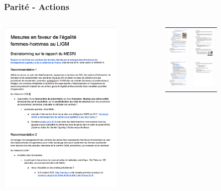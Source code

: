 \documentclass[]{beamer}
\begin{document}

\begin{frame}
  \frametitle{Parité - Actions}

  \begin{center}
    \begin{columns}
      \begin{column}{0.7\textwidth}
        \includegraphics[width=6cm]{pictures/MESRI-01}
      \end{column}
      \begin{column}{0.3\textwidth}
        \begin{tabular}{cc}
          \includegraphics[width=1cm]{pictures/MESRI-02} &
          \includegraphics[width=1cm]{pictures/MESRI-03} \\
          \includegraphics[width=1cm]{pictures/MESRI-04} &
          \includegraphics[width=1cm]{pictures/MESRI-05} \\

\end{tabular}
\end{column}
\end{columns}
\end{center}
\end{frame}
\end{document}
